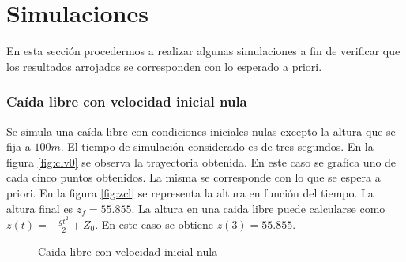 \documentclass[main]{subfiles}
\begin{document}
\section{Simulaciones}
En esta secci\'on procedermos a realizar algunas simulaciones a fin de verificar que los resultados arrojados se corresponden con lo esperado a priori. 

\subsubsection{Ca\'ida libre con velocidad inicial nula}

Se simula una ca\'ida libre con condiciones iniciales nulas excepto la altura que se fija a $100m$. El tiempo de simulaci\'on considerado es de tres segundos. En la figura \ref{fig:clv0} se observa la trayectoria obtenida. En este caso se graf\'ica uno de cada cinco puntos obtenidos. La misma se corresponde con lo que se espera a priori. En la figura \ref{fig:zcl} se representa la altura en funci\'on del tiempo. La altura final es $z_f=55.855$. La altura en una caida libre puede calcularse como $z(t)=-\frac{gt^2}{2}+Z_0$. En este caso se obtiene $z(3)=55.855$.



\begin{figure} [h!]
  \centering
 
  \caption{Caida libre con velocidad inicial nula}
  \label{fig:caida_libre}
\end{figure}
\end{document}
